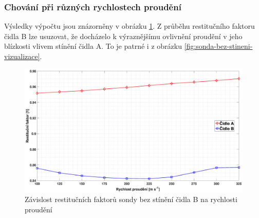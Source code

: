         \subsubsection{Chování při různých rychlostech proudění}
            Výsledky výpočtu jsou znázorněny v obrázku \ref{fig:sonda-bez-stineni-rychlosti}. Z průběhu restitučního faktoru čidla B lze usuzovat, že docházelo k výraznějšímu ovlivnění proudění v jeho blízkosti vlivem stínění čidla A. To je patrné i z obrázku \ref{fig:sonda-bez-stineni-vizualizace}. 
            
            \begin{figure}[ht!]
                \centering
                \includegraphics*[width=\textwidth, trim={5.9cm 1.0cm 5.7cm 2.0cm}]{400_SIMULACE_KONSTRUKCNICH_UPRAV/Grafy/01_rychlosti.eps}
                \caption{Závislost restitučních faktorů sondy bez stínění čidla B na rychlosti proudění}
                \label{fig:sonda-bez-stineni-rychlosti}
            \end{figure}

